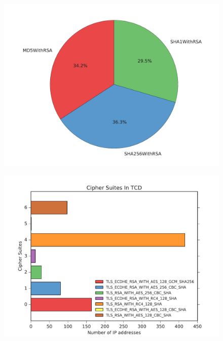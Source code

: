 \documentclass[a4wide,leqno,12pt]{report}
\begin{document}
\begin{figure}[h!]
\includegraphics[scale=.5]{pdf_images/signatureAlgorithms}
\end{figure}



\begin{figure}[h!]
\includegraphics[scale=.5]{pdf_images/CipherSuitesInTCD}
\end{figure}
\end{document}
